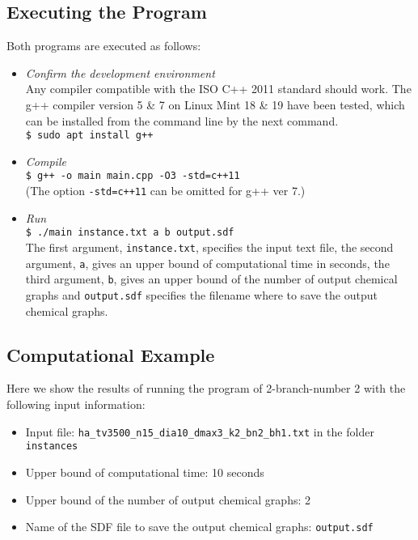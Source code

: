 \documentclass[11pt,titlepage,dvipdfmx,twoside]{article}
\begin{document}
\subsection{Executing the Program}
\label{sec:compile}
Both programs are executed as follows:
\begin{itemize}
	\item {\em Confirm the development environment}\\
		Any compiler compatible with the ISO C++ 2011 standard should work.
		The g++ compiler version 5 \& 7 on Linux Mint 18 \& 19 have been tested, 
		which can be installed from the command line by the next command.\\
		\verb|$ sudo apt install g++|
	\item {\em Compile}\\
		\verb|$ g++ -o main main.cpp -O3 -std=c++11|\\
		(The option \verb|-std=c++11| can be omitted for g++ ver 7.)
	\item {\em Run}\\
		\verb|$ ./main instance.txt a b output.sdf|\\
		The first argument, \verb|instance.txt|, specifies the input text file, 
		the second argument, \verb|a|, gives an upper bound of computational time in seconds,
		the third argument, \verb|b|, gives an upper bound of the number of output chemical graphs and
	\verb|output.sdf| specifies the filename where to save the output chemical graphs.
\end{itemize}


\subsection{Computational Example}
\label{sec:instance}

Here we show the results of running the program of 2-branch-number 2 with the following input information:

\begin{itemize}
\item Input file: {\tt ha\_tv3500\_n15\_dia10\_dmax3\_k2\_bn2\_bh1.txt} in the folder {\tt instances}
\item Upper bound of computational time: 10 seconds
\item Upper bound of the number of output chemical graphs: 2
\item Name of the SDF file to save the output chemical graphs: {\tt output.sdf}
\end{itemize}
\end{document}
